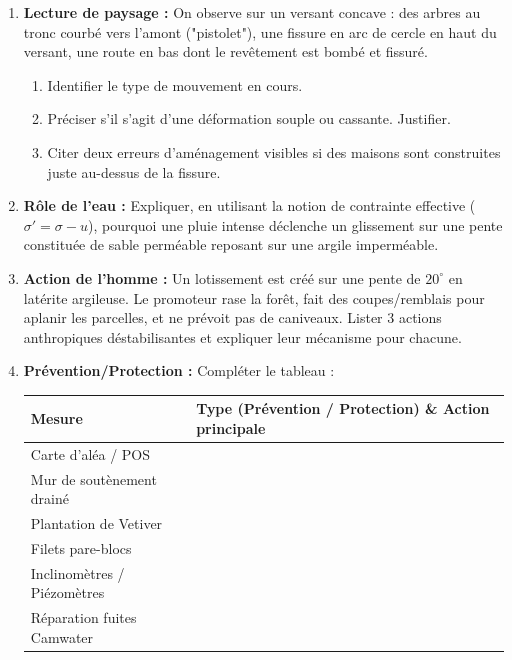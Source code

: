 \documentclass[11pt]{article}
\begin{document}
\begin{exercice}
\begin{enumerate}
    \item \textbf{Lecture de paysage :} On observe sur un versant concave : des arbres au tronc courbé vers l'amont ("pistolet"), une fissure en arc de cercle en haut du versant, une route en bas dont le revêtement est bombé et fissuré. 
    \begin{enumerate}
        \item Identifier le type de mouvement en cours.
        \item Préciser s'il s'agit d'une déformation souple ou cassante. Justifier.
        \item Citer deux erreurs d'aménagement visibles si des maisons sont construites juste au-dessus de la fissure.
    \end{enumerate}
    \item \textbf{Rôle de l'eau :} Expliquer, en utilisant la notion de contrainte effective ($\sigma' = \sigma - u$), pourquoi une pluie intense déclenche un glissement sur une pente constituée de sable perméable reposant sur une argile imperméable.
    \item \textbf{Action de l'homme :} Un lotissement est créé sur une pente de $20^\circ$ en latérite argileuse. Le promoteur rase la forêt, fait des coupes/remblais pour aplanir les parcelles, et ne prévoit pas de caniveaux. Lister 3 actions anthropiques déstabilisantes et expliquer leur mécanisme pour chacune.
    \item \textbf{Prévention/Protection :} Compléter le tableau :
    \begin{center}
    \begin{tabular}{|l|l|}\hline
    \textbf{Mesure} & \textbf{Type (Prévention / Protection) \& Action principale} \\ \hline
    Carte d'aléa / POS & \\ \hline
    Mur de soutènement drainé & \\ \hline
    Plantation de Vetiver & \\ \hline
    Filets pare-blocs & \\ \hline
    Inclinomètres / Piézomètres & \\ \hline
    Réparation fuites Camwater & \\ \hline
    \end{tabular}
    \end{center}
\end{enumerate}
\end{exercice}
\end{document}
